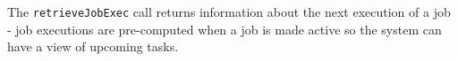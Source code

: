 The \verb+retrieveJobExec+ call returns information about the next execution of a job - job executions are
pre-computed when a job is made active so the system can have a view of upcoming tasks.
